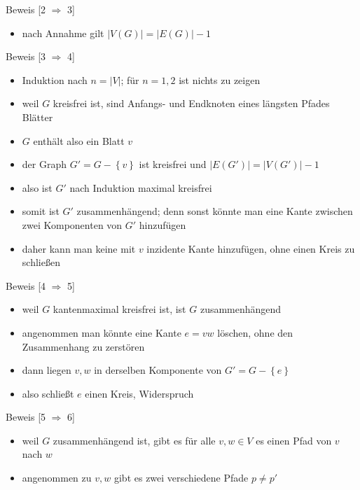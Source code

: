 \documentclass[aspectratio=1610, 11pt]{beamer}
\newcommand\cbc[1]{\left\{{#1}\right\}}
\begin{document}
\begin{frame}
\begin{overprint}
\begin{exampleblock}{Beweis \hfill[2 $\Rightarrow$ 3]}
\begin{itemize}
				\item nach Annahme gilt $|V(G)|=|E(G)|-1$
			\end{itemize}
		\end{exampleblock}
		\begin{exampleblock}{Beweis \hfill[3 $\Rightarrow$ 4]}
			\begin{itemize}
				\item Induktion nach $n=|V|$; f\"ur $n=1,2$ ist nichts zu zeigen
				\item weil $G$ kreisfrei ist, sind Anfangs- und Endknoten eines l\"angsten Pfades Bl\"atter
				\item $G$ enth\"alt also ein Blatt $v$
				\item der Graph $G'=G-\cbc v$ ist kreisfrei und $|E(G')|=|V(G')|-1$
				\item also ist $G'$ nach Induktion maximal kreisfrei
				\item somit ist $G'$ zusammenh\"angend; denn sonst k\"onnte man eine Kante zwischen zwei Komponenten von $G'$ hinzuf\"ugen
				\item daher kann man keine mit $v$ inzidente Kante hinzuf\"ugen, ohne einen Kreis zu schlie\ss en
			\end{itemize}
		\end{exampleblock}
		\begin{exampleblock}{Beweis \hfill[4 $\Rightarrow$ 5]}
			\begin{itemize}
				\item weil $G$ kantenmaximal kreisfrei ist, ist $G$ zusammenh\"angend
				\item angenommen man k\"onnte eine Kante $e=vw$ l\"oschen, ohne den Zusammenhang zu zerst\"oren
				\item dann liegen $v,w$ in derselben Komponente von $G'=G-\cbc{e}$
				\item also schlie\ss t $e$ einen Kreis, Widerspruch
			\end{itemize}
		\end{exampleblock}
		\begin{exampleblock}{Beweis \hfill[5 $\Rightarrow$ 6]}
			\begin{itemize}
				\item weil $G$ zusammenh\"angend ist, gibt es f\"ur alle $v,w\in V$ es einen Pfad von $v$ nach $w$
				\item angenommen zu $v,w$ gibt es zwei verschiedene Pfade $p\neq p'$

\end{itemize}
\end{exampleblock}
\end{overprint}
\end{frame}
\end{document}
